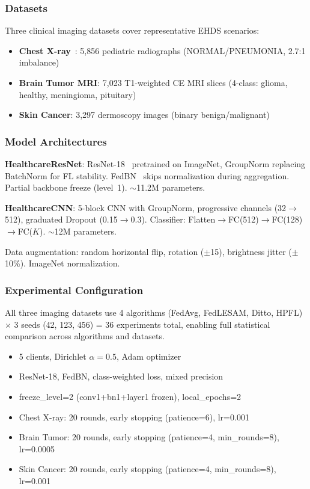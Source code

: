 \documentclass[conference]{IEEEtran}
\begin{document}
\subsubsection{Datasets}

Three clinical imaging datasets cover representative EHDS scenarios:
\begin{itemize}
    \item \textbf{Chest X-ray}~\cite{chestxray2018}: 5,856 pediatric radiographs (NORMAL/PNEUMONIA, 2.7:1 imbalance)
    \item \textbf{Brain Tumor MRI}: 7,023 T1-weighted CE MRI slices (4-class: glioma, healthy, meningioma, pituitary)
    \item \textbf{Skin Cancer}: 3,297 dermoscopy images (binary benign/malignant)
\end{itemize}

\subsubsection{Model Architectures}

\textbf{HealthcareResNet}: ResNet-18~\cite{he2016deep} pretrained on ImageNet, GroupNorm replacing BatchNorm for FL stability. FedBN~\cite{li2021fedbn} skips normalization during aggregation. Partial backbone freeze (level~1). $\sim$11.2M parameters.

\textbf{HealthcareCNN}: 5-block CNN with GroupNorm, progressive channels (32$\to$512), graduated Dropout (0.15$\to$0.3). Classifier: Flatten$\to$FC(512)$\to$FC(128)$\to$FC($K$). $\sim$12M parameters.

Data augmentation: random horizontal flip, rotation ($\pm$15\textdegree), brightness jitter ($\pm$10\%). ImageNet normalization.

\subsubsection{Experimental Configuration}

All three imaging datasets use 4 algorithms (FedAvg, FedLESAM, Ditto, HPFL) $\times$ 3 seeds (42, 123, 456) = 36 experiments total, enabling full statistical comparison across algorithms and datasets.

\begin{itemize}
    \item 5 clients, Dirichlet $\alpha{=}0.5$, Adam optimizer
    \item ResNet-18, FedBN, class-weighted loss, mixed precision
    \item freeze\_level=2 (conv1+bn1+layer1 frozen), local\_epochs=2
    \item Chest X-ray: 20 rounds, early stopping (patience=6), lr=0.001
    \item Brain Tumor: 20 rounds, early stopping (patience=4, min\_rounds=8), lr=0.0005
    \item Skin Cancer: 20 rounds, early stopping (patience=4, min\_rounds=8), lr=0.001
\end{itemize}
\end{document}
